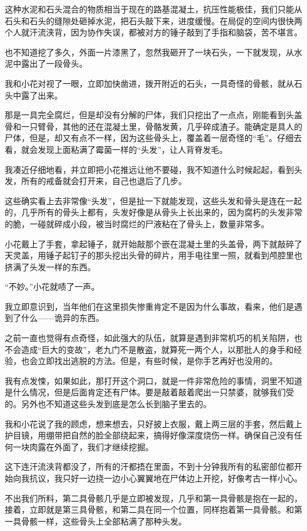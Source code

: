 这种水泥和石头混合的物质相当于现在的路基混凝土，抗压性能极佳，我们只能从石头和石头的缝隙处砸掉水泥，把石头敲下来，进度缓慢。在局促的空间内很快两个人就汗流浃背，因为协作失误，都被对方的锤子敲到了手指和脑袋，苦不堪言。

也不知道挖了多久，外面一片漆黑了，忽然我砸开了一块石头，一下就发现，从水泥中露出了一段骨头。

我和小花对视了一眼，立即加快凿进，拨开附近的石头，一具奇怪的骨骸，就从石头中露了出来。

那是一具完全腐烂，但是却没有分解的尸体，我们只挖出了一点点，刚能看到头盖骨和一只臂骨，其他的还在混凝土里，骨骼发黄，几乎碎成渣子。能确定是具人的尸体，但是，却又有点不一样，因为这些骨头上，覆盖着一层奇怪的“毛”。仔细去看，就会发现上面粘满了霉菌一样的“头发”，让人背脊发毛。

我凑近仔细地看，并立即把小花推远让他不要碰，我不知道什么时候起起，看到头发，所有的戒备就会打开来，自己也退后了几步。

这些确实看上去非常像“头发”，但是扯一下就能发现，这些头发和骨头是连在一起的，几乎所有的骨头上都有，头发好像是从骨头上长出来的，因为腐朽的头发非常的脆，一碰就碎成小段，被当时腐烂的尸液粘在了骨头上，数量非常多。

小花戴上了手套，拿起锤子，就开始敲那个嵌在混凝土里的头盖骨，两下就敲碎了天灵盖，用锤子起钉子的那头挖出头骨的碎片，用手电往里一照，就看到颅腔里也挤满了头发一样的东西。

“不妙。”小花就啧了一声。

我立即意识到，当年他们在这里损失惨重肯定不是因为什么事故，看来，他们是遇到了什么——诡异的东西。

之前一直也觉得有点奇怪，如此强大的队伍，就算是遇到非常机巧的机关陷阱，也不会造成“巨大的变故”，老九门不是散盗，就算死一两个人，以那批人的身手和经验，也会立即找出逃脱的方法。但是，有些时候，是你手艺再好也没用的。

我有点发悚，如果如此，那打开这个洞口，就是一件非常危险的事情，洞里不知道是什么情况，但是后面肯定还有尸体。要是敲着敲着爬出一只禁婆，就够我们受的。另外也不知道这些头发到底是怎么长到脑子里去的。

我和小花说了我的顾虑，想来想去，只好披上衣服，戴上两三层的手套，然后戴上护目镜，用绷带把自然的脸全部绕起来，搞得好像深度烧伤一样。确保自己没有任何一块肉露在外面了，我们才继续挖掘。

这下连汗流浃背都没了，所有的汗都捂在里面，不到十分钟我所有的私密部位都开始向我抗议，我只好一边挠一边小心翼翼地在尸体边上开挖，好像考古一样小心。

不出我们所料，第二具骨骸几乎是立即被发现，几乎和第一具骨骸是抱在一起的，接着，立即就是第三具骨骸，和第二具在同一个位置，同样抱着第一具骨骸。和第一具骨骸一样，这些骨头上全部粘满了那种头发。

